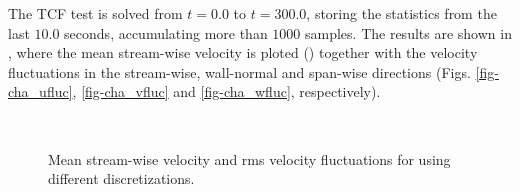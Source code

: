 The TCF test is solved from $ t=0.0 $ to $ t=300.0 $, storing the statistics from the last $ 10.0 $ seconds, accumulating more than $ 1000 $ samples. The results are shown in , where the mean stream-wise velocity is ploted () together with the velocity fluctuations in the stream-wise, wall-normal and span-wise directions (Figs. \ref{fig-cha_ufluc}, \ref{fig-cha_vfluc} and \ref{fig-cha_wfluc}, respectively).
\begin{figure}[h!]
	\centering	
	\\   
	\caption{Mean stream-wise velocity and rms velocity fluctuations for using different discretizations.}
	\label{fig-cha_vel}
\end{figure}

